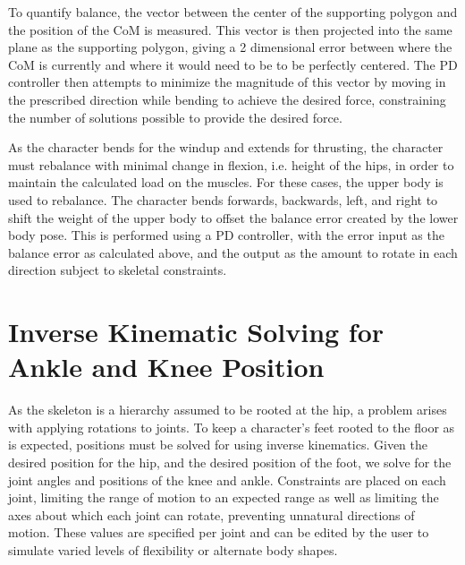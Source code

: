 To quantify balance, the vector between the center of the supporting polygon and the position of the CoM is measured.  This vector is then projected into the same plane as the supporting polygon, giving a 2 dimensional error between where the CoM is currently and where it would need to be to be perfectly centered.  The PD controller then attempts to minimize the magnitude of this vector by moving in the prescribed direction while bending to achieve the desired force, constraining the number of solutions possible to provide the desired force.


As the character bends for the windup and extends for thrusting, the character must rebalance with minimal change in flexion, i.e. height of the hips, in order to maintain the calculated load on the muscles.  For these cases, the upper body is used to rebalance.  The character bends forwards, backwards, left, and right to shift the weight of the upper body to offset the balance error created by the lower body pose.  This is performed using a PD controller, with the error input as the balance error as calculated above, and the output as the amount to rotate in each direction subject to skeletal constraints.

\section{Inverse Kinematic Solving for Ankle and Knee Position}
\label{section:ik}


As the skeleton is a hierarchy assumed to be rooted at the hip, a problem arises with applying rotations to joints.  To keep a character's feet rooted to the floor as is expected, positions must be solved for using inverse kinematics.  Given the desired position for the hip, and the desired position of the foot, we solve for the joint angles and positions of the knee and ankle.  Constraints are placed on each joint, limiting the range of motion to an expected range as well as limiting the axes about which each joint can rotate, preventing unnatural directions of motion.  These values are specified per joint and can be edited by the user to simulate varied levels of flexibility or alternate body shapes.


